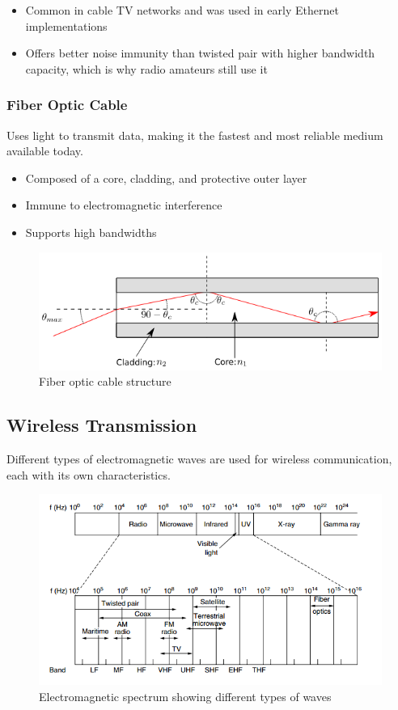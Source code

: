 \begin{itemize}
    \item Common in cable TV networks and was used in early Ethernet implementations
    \item Offers better noise immunity than twisted pair with higher bandwidth capacity, which is why radio amateurs still use it
\end{itemize}

\vspace{1em}

\newpage
\subsubsection*{Fiber Optic Cable}
Uses light to transmit data, making it the fastest and most reliable medium available today.

\begin{itemize}
    \item Composed of a core, cladding, and protective outer layer
    \item Immune to electromagnetic interference
    \item Supports high bandwidths
\end{itemize}

\begin{figure}
    \centering
    \includegraphics[width=.8\textwidth]{assets/osi/physical/fiber.png}
    \caption{Fiber optic cable structure}\label{fig:fiber_optic}
\end{figure}

\vspace{1em}

\subsection*{Wireless Transmission}
Different types of electromagnetic waves are used for wireless communication, each with its own characteristics.

\begin{figure}[h]
    \centering
    \includegraphics[width=.8\textwidth]{assets/osi/physical/spectrum.png}
    \caption{Electromagnetic spectrum showing different types of waves}\label{fig:em_spectrum}
\end{figure}

